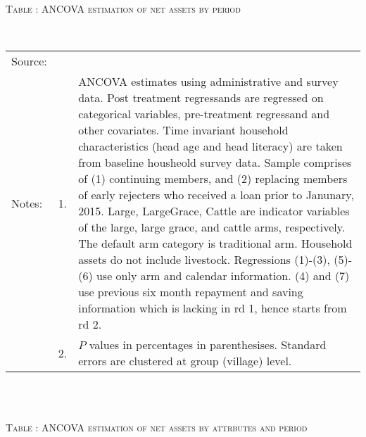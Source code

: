 \hspace{-1cm}\begin{minipage}[t]{14cm} \hfil\textsc{\normalsize Table \thetable: ANCOVA estimation of net assets by period\label{tab ANCOVA net assets timevarying}}\\ \setlength{\tabcolsep}{1pt}
  \setlength{\baselineskip}{8pt}
  \renewcommand{\arraystretch}{.55}
  \hfil{}\\
\renewcommand{\arraystretch}{.8}
\setlength{\tabcolsep}{1pt} \begin{tabular}{>{\hfill\scriptsize}p{1cm}<{}>{\hfill\scriptsize}p{.25cm}<{}>{\scriptsize}p{12cm}<{\hfill}} 
Source:& \multicolumn{2}{l}{\scriptsize Estimated with GUK administrative and survey data.}\\
Notes: & 1. & ANCOVA estimates using administrative and survey data. Post treatment regressands are regressed on categorical variables, pre-treatment regressand and other covariates. Time invariant household characteristics (head age and head literacy) are taken from baseline housheold survey data. Sample comprises of (1) continuing members, and (2) replacing members of early rejecters who received a loan prior to Janunary, 2015.  \textsf{Large}, \textsf{LargeGrace}, \textsf{Cattle} are indicator variables of the \textsf{large}, \textsf{large grace}, and \textsf{cattle} arms, respectively. The default arm category is \textsf{traditional} arm. Household assets do not include livestock. Regressions (1)-(3), (5)-(6) use only arm and calendar information. (4) and (7) use previous six month repayment and saving information which is lacking in rd 1, hence starts from rd 2.\\
& 2. &  $P$ values in percentages in parenthesises. Standard errors are clustered at group (village) level. %
 \end{tabular}
\end{minipage} \\\\\hspace{-1cm}\begin{minipage}[t]{14cm} \hfil\textsc{\normalsize Table \thetable: ANCOVA estimation of net assets by attrbutes and period\label{tab ANCOVA net assets timevarying attributes}}\\ \setlength{\tabcolsep}{1pt}

\end{minipage}
